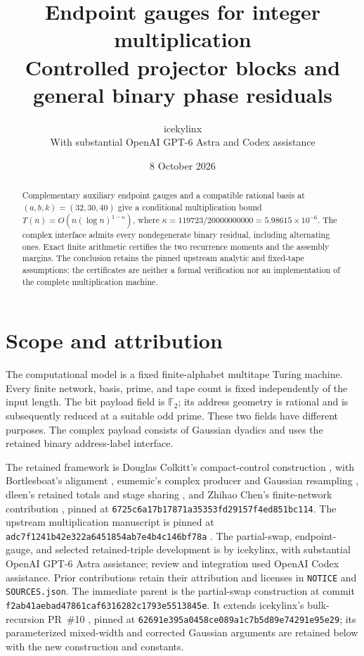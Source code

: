 \documentclass[11pt]{article}
\title{Endpoint gauges for integer multiplication\\
\large Controlled projector blocks and general binary phase residuals}
\author{icekylinx\\\small With substantial OpenAI GPT-6 Astra and Codex assistance}
\date{8 October 2026}
\begin{document}
\maketitle
\begin{abstract}
Complementary auxiliary endpoint gauges and a compatible rational basis at
$(a,b,k)=(32,30,40)$ give a conditional multiplication bound
$T(n)=O(n(\log n)^{1-\kappa})$, where
$\kappa=119723/20000000000=5.98615\times10^{-6}$.
The complex interface admits every nondegenerate binary residual, including
alternating ones. Exact finite arithmetic certifies the two recurrence
moments and the assembly margins. The conclusion retains the pinned upstream
analytic and fixed-tape assumptions; the certificates are neither a formal
verification nor an implementation of the complete multiplication machine.
\end{abstract}
\section{Scope and attribution}
The computational model is a fixed finite-alphabet multitape Turing machine.
Every finite network, basis, prime, and tape count is fixed independently of
the input length. The bit payload field is $\mathbb F_2$; its address
geometry is rational and is subsequently reduced at a suitable odd prime.
These two fields have different purposes. The complex payload consists of
Gaussian dyadics and uses the retained binary address-label interface.

The retained framework is Douglas Colkitt's compact-control construction
\cite{main}, with Bortlesboat's alignment \cite{pr2}, eumemic's complex
producer and Gaussian resampling \cite{pr3,pr5,pr6}, dleen's retained totals
and stage sharing \cite{pr4}, and Zhihao Chen's finite-network contribution
\cite{pr7}, pinned at
\texttt{6725c6a17b17871a35353fd29157f4ed851bc114}.
The upstream multiplication manuscript is pinned at
\texttt{adc7f1241b42e322a6451854ab7e4b4c146bf78a} \cite{upstream}.
The partial-swap, endpoint-gauge, and selected retained-triple development is by icekylinx,
with substantial OpenAI GPT-6 Astra assistance; review and integration used
OpenAI Codex assistance. Prior contributions retain their attribution and
licenses in \texttt{NOTICE} and \texttt{SOURCES.json}.
The immediate parent is the partial-swap construction at commit
\texttt{f2ab41aebad47861caf6316282c1793e5513845e}.
It extends icekylinx's bulk-recursion PR~\#10 \cite{pr10},
pinned at \texttt{62691e395a0458ce089a1c7b5d89e74291e95e29}; its
parameterized mixed-width and corrected Gaussian arguments are retained
below with the new construction and constants.
\end{document}

